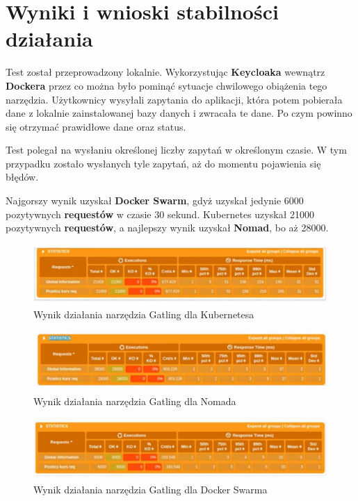 \documentclass{iiuwb}
\begin{document}
\section{Wyniki i wnioski stabilności działania}

Test został przeprowadzony lokalnie. Wykorzystując 
\textbf{Keycloaka} wewnątrz \textbf{Dockera} przez co 
można było pominąć sytuacje chwilowego obiążenia tego 
narzędzia. Użytkownicy wysyłali zapytania do aplikacji, 
która potem pobierała dane z lokalnie zainstalowanej 
bazy danych i zwracała te dane. Po czym powinno się 
otrzymać prawidłowe dane oraz status.

Test polegał na wysłaniu określonej liczby zapytań 
w określonym czasie. W tym przypadku zostało wysłanych 
tyle zapytań, aż do momentu pojawienia się błędów. 

Najgorszy wynik uzyskał \textbf{Docker Swarm}, gdyż 
uzyskał jedynie 6000 pozytywnych \textbf{requestów} 
w czasie 30 sekund. Kubernetes uzyskał 21000 pozytywnych 
\textbf{requestów}, a najlepszy wynik uzyskał \textbf{Nomad},
bo aż 28000.

\begin{figure}[!h]
\centering
\includegraphics[width=12cm]{kubernetes/ObciazenieKubernetes.pdf}
\caption{Wynik działania narzędzia Gatling dla Kubernetesa}
\label{fig: Wynik działania narzędzia Gatling dla Kubernetesa}
\end{figure}

\begin{figure}[!h]
\centering
\includegraphics[width=12cm]{nomad/ObciazenieNomad.pdf}
\caption{Wynik działania narzędzia Gatling dla Nomada}
\label{fig: Wynik działania narzędzia Gatling dla Nomada}
\end{figure}

\begin{figure}[!h]
\centering
\includegraphics[width=12cm]{swarm/ObiazenieDockerSwarm.pdf}
\caption{Wynik działania narzędzia Gatling dla Docker Swarma}
\label{fig: Wynik działania narzędzia Gatling dla Docker Swarma}
\end{figure}
\end{document}

